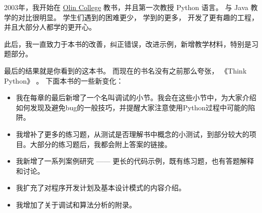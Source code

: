 
2003年，我开始在 \href{http://www.olin.edu/}{Olin College} 教书，并且第一次教授 Python 语言。 与 Java 教学的对比很明显。 学生们遇到的困难更少， 学到的更多， 开发了更有趣的工程， 并且大部分人都学的更开心。


此后，我一直致力于本书的改善，纠正错误，改进示例，新增教学材料，特别是习题部分。


最后的结果就是你看到的这本书。 而现在的书名没有之前那么夸张， 《Think Python》 。 下面本书的一些新变化：


\begin{itemize}

\item 我在每章的最后新增了一个名叫调试的小节。我会在这些小节中，为大家介绍如何发现及避免bug的一般技巧，并提醒大家注意使用Python过程中可能的陷阱。

\item 我增补了更多的练习题，从测试是否理解书中概念的小测试，到部分较大的项目。大部分的练习题后，我都会附上答案的链接。

\item 我新增了一系列案例研究 —— 更长的代码示例，既有练习题，也有答题解释和讨论。

\item 我扩充了对程序开发计划及基本设计模式的内容介绍。

\item 我增加了关于调试和算法分析的附录。

\end{itemize}

